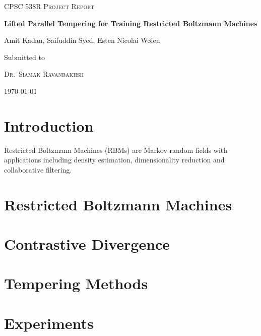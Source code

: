 \documentclass[12pt]{article}
\begin{document}
\begin{titlepage}
	\centering
	
	{\scshape \Large CPSC 538R Project Report
\par}
	\vspace{1cm}
	{\huge\bfseries Lifted Parallel Tempering for Training Restricted Boltzmann Machines
\par}
	\vspace{0.5cm}
	{\Large  Amit Kadan, Saifuddin Syed, Esten Nicolai W{\o}ien
\par}

	\vfill
	Submitted to\par
	{\scshape Dr.~Siamak Ravanbakhsh}\\
		{ \today\par}



\end{titlepage}

\tableofcontents
\newpage

\section{Introduction}
Restricted Boltzmann Machines (RBMs) are Markov random fields with applications including density estimation, 
dimensionality reduction and collaborative filtering.

\section{Restricted Boltzmann Machines}


\section{Contrastive Divergence}

\section{Tempering Methods}



\section{Experiments}

 

\end{document}
